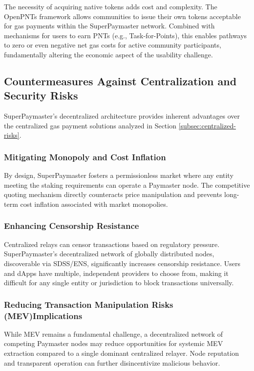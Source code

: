 \documentclass[preprint,12pt]{elsarticle}
\begin{document}
The necessity of acquiring native tokens adds cost and complexity. The OpenPNTs framework allows communities to issue their own tokens acceptable for gas payments within the SuperPaymaster network. Combined with mechanisms for users to earn PNTs (e.g., Task-for-Points), this enables pathways to zero or even negative net gas costs for active community participants, fundamentally altering the economic aspect of the usability challenge.

\subsection{Countermeasures Against Centralization and Security Risks}
\label{subsec:centralization-countermeasures}

SuperPaymaster's decentralized architecture provides inherent advantages over the centralized gas payment solutions analyzed in Section \ref{subsec:centralized-risks}.

\subsubsection{Mitigating Monopoly and Cost Inflation}

By design, SuperPaymaster fosters a permissionless market where any entity meeting the staking requirements can operate a Paymaster node. The competitive quoting mechanism directly counteracts price manipulation and prevents long-term cost inflation associated with market monopolies.

\subsubsection{Enhancing Censorship Resistance}

Centralized relays can censor transactions based on regulatory pressure. SuperPaymaster's decentralized network of globally distributed nodes, discoverable via SDSS/ENS, significantly increases censorship resistance. Users and dApps have multiple, independent providers to choose from, making it difficult for any single entity or jurisdiction to block transactions universally.

\subsubsection{Reducing Transaction Manipulation Risks (MEV)Implications}

While MEV remains a fundamental challenge, a decentralized network of competing Paymaster nodes may reduce opportunities for systemic MEV extraction compared to a single dominant centralized relayer. Node reputation and transparent operation can further disincentivize malicious behavior.
\end{document}
